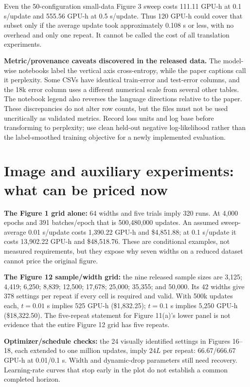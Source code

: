 \documentclass{article}
\begin{document}
Even the 50-configuration small-data Figure 3 sweep costs 111.11 GPU-h at
0.1 s/update and 555.56 GPU-h at 0.5 s/update. Thus 120 GPU-h could cover
that subset only if the average update took approximately 0.108 s or less,
with no overhead and only one repeat. It cannot be called the cost of all
translation experiments.

\textbf{Metric/provenance caveats discovered in the released data.}
The model-wise notebooks label the vertical axis cross-entropy, while the
paper captions call it perplexity. Some CSVs have identical train-error and
test-error columns, and the 18k error column uses a different numerical scale
from several other tables. The notebook legend also reverses the language
directions relative to the paper. These discrepancies do not alter row
counts, but the files must not be used uncritically as validated metrics.
Record loss units and log base before transforming to perplexity; use clean
held-out negative log-likelihood rather than the label-smoothed training
objective for a newly implemented evaluation.

\section{Image and auxiliary experiments: what can be priced now}
\textbf{The Figure 1 grid alone:} 64 widths and five trials imply 320 runs.
At 4,000 epochs and 391 batches/epoch that is 500,480,000 updates.
An assumed sweep-average 0.01 s/update costs 1,390.22 GPU-h and
\$4,851.88; at 0.1 s/update it costs 13,902.22 GPU-h and \$48,518.76.
These are conditional examples, not measured requirements, but they expose
why seven widths on a reduced dataset cannot price the original figure.

\textbf{The Figure 12 sample/width grid:} the nine released sample sizes are
3,125; 4,419; 6,250; 8,839; 12,500; 17,678; 25,000; 35,355; and 50,000.
Its 42 widths give 378 settings per repeat if every cell is required and
valid. With 500k updates each, $t=0.01$ s implies 525 GPU-h
(\$1,832.25); $t=0.1$ s implies 5,250 GPU-h (\$18,322.50).
The five-repeat statement for Figure 11(a)'s lower panel is not evidence
that the entire Figure 12 grid has five repeats.

\textbf{Optimizer/schedule checks:} the 24 visually identified settings in
Figures 16--18, each extended to one million updates, imply $24L$ per
repeat: 66.67/666.67 GPU-h at 0.01/0.1 s. Width and dynamic-drop parameters
still need recovery. Learning-rate curves that stop early in the plot do
not establish a common completed horizon.
\end{document}
